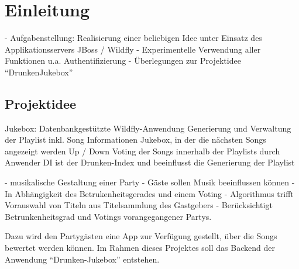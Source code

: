 \section{Einleitung}

- Aufgabenstellung: Realisierung einer beliebigen Idee unter Einsatz des Applikationsservers JBoss / Wildfly
- Experimentelle Verwendung aller Funktionen u.a. Authentifizierung
- Überlegungen zur Projektidee "`DrunkenJukebox"'

\subsection{Projektidee}

Jukebox: Datenbankgestützte Wildfly-Anwendung
Generierung und Verwaltung der Playlist inkl. Song Informationen
Jukebox, in der die nächsten Songs angezeigt werden
Up / Down Voting der Songs innerhalb der Playlists durch Anwender
DI ist der Drunken-Index und beeinflusst die Generierung der Playlist

- musikalische Gestaltung einer Party
- Gäste sollen Musik beeinflussen können
	- In Abhängigkeit des Betrukenheitsgerades und einem Voting
- Algorithmus trifft Vorauswahl von Titeln aus Titelsammlung des Gastgebers
	- Berücksichtigt Betrunkenheitsgrad und Votings vorangegangener Partys.

Dazu wird den Partygästen eine App zur Verfügung gestellt, über die Songs bewertet werden können. Im Rahmen dieses Projektes soll das Backend der Anwendung "`Drunken-Jukebox"' entstehen. 